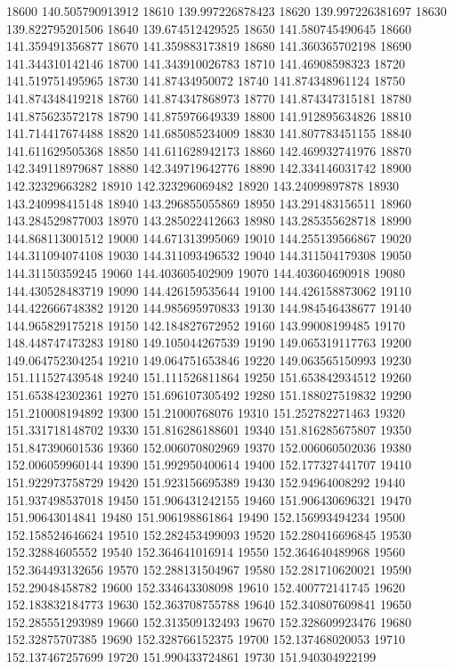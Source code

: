 {18600 140.505790913912
18610 139.997226878423
18620 139.997226381697
18630 139.822795201506
18640 139.674512429525
18650 141.580745490645
18660 141.359491356877
18670 141.359883173819
18680 141.360365702198
18690 141.344310142146
18700 141.343910026783
18710 141.46908598323
18720 141.519751495965
18730 141.87434950072
18740 141.874348961124
18750 141.874348419218
18760 141.874347868973
18770 141.874347315181
18780 141.875623572178
18790 141.875976649339
18800 141.912895634826
18810 141.714417674488
18820 141.685085234009
18830 141.807783451155
18840 141.611629505368
18850 141.611628942173
18860 142.469932741976
18870 142.349118979687
18880 142.349719642776
18890 142.334146031742
18900 142.32329663282
18910 142.323296069482
18920 143.24099897878
18930 143.240998415148
18940 143.296855055869
18950 143.291483156511
18960 143.284529877003
18970 143.285022412663
18980 143.285355628718
18990 144.868113001512
19000 144.671313995069
19010 144.255139566867
19020 144.311094074108
19030 144.311093496532
19040 144.311504179308
19050 144.31150359245
19060 144.403605402909
19070 144.403604690918
19080 144.430528483719
19090 144.426159535644
19100 144.426158873062
19110 144.422666748382
19120 144.985695970833
19130 144.984546438677
19140 144.965829175218
19150 142.184827672952
19160 143.99008199485
19170 148.448747473283
19180 149.105044267539
19190 149.065319117763
19200 149.064752304254
19210 149.064751653846
19220 149.063565150993
19230 151.111527439548
19240 151.111526811864
19250 151.653842934512
19260 151.653842302361
19270 151.696107305492
19280 151.188027519832
19290 151.210008194892
19300 151.21000768076
19310 151.252782271463
19320 151.331718148702
19330 151.816286188601
19340 151.816285675807
19350 151.847390601536
19360 152.006070802969
19370 152.006060502036
19380 152.006059960144
19390 151.992950400614
19400 152.177327441707
19410 151.922973758729
19420 151.923156695389
19430 152.94964008292
19440 151.937498537018
19450 151.906431242155
19460 151.906430696321
19470 151.90643014841
19480 151.906198861864
19490 152.156993494234
19500 152.158524646624
19510 152.282453499093
19520 152.280416696845
19530 152.32884605552
19540 152.364641016914
19550 152.364640489968
19560 152.364493132656
19570 152.288131504967
19580 152.281710620021
19590 152.29048458782
19600 152.334643308098
19610 152.400772141745
19620 152.183832184773
19630 152.363708755788
19640 152.340807609841
19650 152.285551293989
19660 152.313509132493
19670 152.328609923476
19680 152.32875707385
19690 152.328766152375
19700 152.137468020053
19710 152.137467257699
19720 151.990433724861
19730 151.940304922199
}
